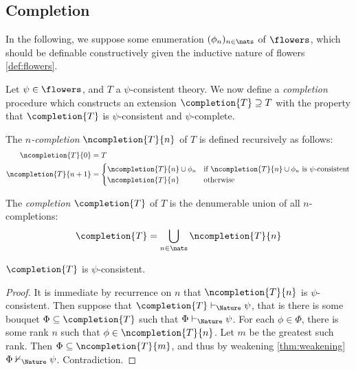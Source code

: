 \subsection{Completion}

In the following, we suppose some enumeration $(\phi_n)_{n \in \nats}$ of
$\flowers$, which should be definable constructively given the
inductive nature of flowers \ref{def:flowers}.

Let $\psi \in \flowers$, and $T$ a $\psi$-consistent theory. We now
define a \emph{completion} procedure which constructs an extension
$\completion{T} \supseteq T$ with the property that $\completion{T}$ is
$\psi$-consistent and $\psi$-complete.

\begin{definition}[$n$-completion]
  The \emph{$n$-completion} $\ncompletion{T}{n}$ of $T$ is defined recursively
  as follows:
  \begin{align*}
    \ncompletion{T}{0} &= T \\
    \ncompletion{T}{n+1} &=
    \begin{cases}
      \ncompletion{T}{n} \cup \phi_n &\text{if $\ncompletion{T}{n} \cup \phi_n$ is $\psi$-consistent} \\
      \ncompletion{T}{n} &\text{otherwise}
    \end{cases}
  \end{align*}
\end{definition}

\begin{definition}[Completion]
  The \emph{completion} $\completion{T}$ of $T$ is the denumerable union of all
  $n$-completions:
  $$\completion{T} = \bigcup_{n \in \nats}{\ncompletion{T}{n}}$$
\end{definition}

\begin{lemma}\label{thm:completion-consistent}
  $\completion{T}$ is $\psi$-consistent.
\end{lemma}
\begin{proof}
  It is immediate by recurrence on $n$ that $\ncompletion{T}{n}$ is
  $\psi$-consistent. Then suppose that $\completion{T} \vdash_\Nature \psi$, that is
  there is some bouquet $\Phi \subseteq \completion{T}$ such that $\Phi \vdash_\Nature
  \psi$. For each $\phi \in \Phi$, there is some rank $n$ such that $\phi \in
  \ncompletion{T}{n}$. Let $m$ be the greatest such rank. Then $\Phi \subseteq
  \ncompletion{T}{m}$, and thus by weakening \ref{thm:weakening} $\Phi \nvdash_\Nature
  \psi$. Contradiction.
\end{proof}


